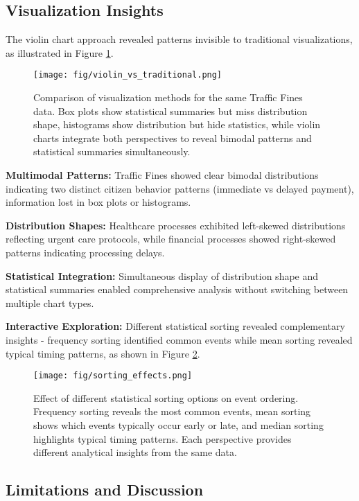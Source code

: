 \subsection{Visualization Insights}
\label{subsec:insights}

The violin chart approach revealed patterns invisible to traditional visualizations, as illustrated in Figure \ref{fig:violin_vs_traditional}.

\begin{figure}[H]
\centering
\texttt{[image: fig/violin\_vs\_traditional.png]}
\caption{Comparison of visualization methods for the same Traffic Fines data. Box plots show statistical summaries but miss distribution shape, histograms show distribution but hide statistics, while violin charts integrate both perspectives to reveal bimodal patterns and statistical summaries simultaneously.}
\label{fig:violin_vs_traditional}
\end{figure}

\textbf{Multimodal Patterns:} Traffic Fines showed clear bimodal distributions indicating two distinct citizen behavior patterns (immediate vs delayed payment), information lost in box plots or histograms.

\textbf{Distribution Shapes:} Healthcare processes exhibited left-skewed distributions reflecting urgent care protocols, while financial processes showed right-skewed patterns indicating processing delays.

\textbf{Statistical Integration:} Simultaneous display of distribution shape and statistical summaries enabled comprehensive analysis without switching between multiple chart types.

\textbf{Interactive Exploration:} Different statistical sorting revealed complementary insights - frequency sorting identified common events while mean sorting revealed typical timing patterns, as shown in Figure \ref{fig:sorting_effects}.

\begin{figure}[H]
\centering
\texttt{[image: fig/sorting\_effects.png]}
\caption{Effect of different statistical sorting options on event ordering. Frequency sorting reveals the most common events, mean sorting shows which events typically occur early or late, and median sorting highlights typical timing patterns. Each perspective provides different analytical insights from the same data.}
\label{fig:sorting_effects}
\end{figure}

\subsection{Limitations and Discussion}
\label{subsec:limitations}

